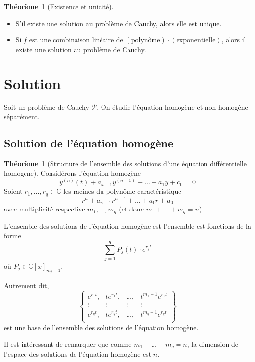 \documentclass[11pt,a4paper]{article}
\theoremstyle{definition}
\newtheorem{mytheo}[mydef]{Théorème}
\newcommand{\C}{\mathbb{C}}
\newcommand*\InsertTheoremBreak{%
	\begingroup %
		\setlength\itemsep{0pt}%
		\setlength\parsep{0pt}%
		\item[\vbox{\null}]%
	\endgroup%
}%
\begin{document}
\begin{mytheo}[Existence et unicité]\InsertTheoremBreak
	\begin{itemize}
		\item S'il existe une solution au problème de Cauchy, alors elle est unique.
		\item Si $f$ est une combinaison linéaire de $(\mathrm{polynôme})\cdot(\mathrm{exponentielle})$,
			alors il existe une solution au problème de Cauchy.
	\end{itemize}
\end{mytheo}

\section{Solution}

Soit un problème de Cauchy $\mathcal{P}$. On étudie l'équation homogène et non-homogène séparément.

\subsection{Solution de l'équation homogène}
\begin{mytheo}[Structure de l'ensemble des solutions d'une équation différentielle homogène]
	Considérons l'équation homogène
	\[ y^{(n)}(t) + a_{n-1}y^{(n-1)} + \dots + a_1y + a_0 = 0 \]
	Soient $r_1, \dots, r_q \in \C$ les racines du polynôme caractéristique
	\[ r^n + a_{n-1}r^{n-1} + \dots + a_1r + a_0 \]
	avec multiplicité respective $m_1, \dots, m_q$ (et donc $m_1 + \dots + m_q = n$).

	L'ensemble des solutions de l'équation homogène est l'ensemble est fonctions de la forme
	\[ \sum_{j=1}^{q} P_j(t) \cdot e^{r_j t} \]
	où $P_j \in \C[x]_{m_j -1}$.

	Autrement dit,
	\[ \begin{Bmatrix}
		e^{r_1t}, & te^{r_1t}, & \dots, & t^{m_1-1}e^{r_1t}\\
		\vdots & \vdots & \vdots & \vdots\\
		e^{r_qt}, & te^{r_qt}, & \dots, & t^{m_q-1}e^{r_qt}\\
	\end{Bmatrix} \]
	est une base de l'ensemble des solutions de l'équation homogène.

	Il est intéressant de remarquer que comme $m_1 + \dots + m_q = n$,
	la dimension de l'espace des solutions de l'équation homogène est $n$.
\end{mytheo}
\end{document}

